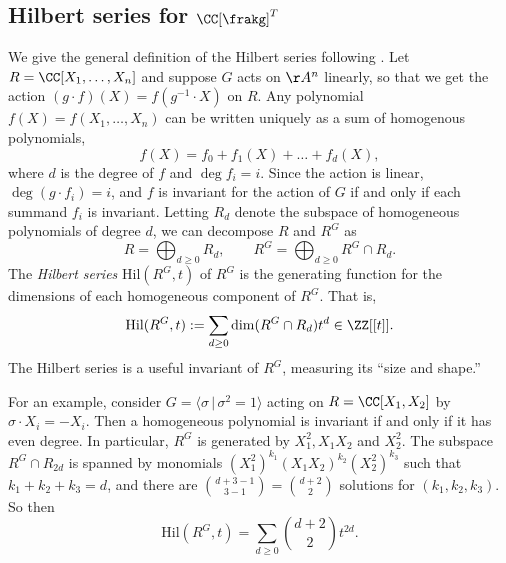 \subsection{Hilbert series for $\CC[\frakg]^T$}
We give the general definition of the Hilbert series following \cite[\S 1.2]{Mukai03}.
Let $R = \CC[X_1, \ldots, X_n]$ and suppose $G$ acts on $\AA^n$ linearly, so that we get the action $(g\cdot f)(X) = f(g^{-1} \cdot X)$ on $R$.
Any polynomial $f(X) = f(X_1, \ldots, X_n)$ can be written uniquely as a sum of homogenous polynomials,
$$f(X) = f_0 + f_1(X) + \ldots + f_d(X),$$
where $d$ is the degree of $f$ and $\deg f_i = i$.
Since the action is linear, $\deg (g\cdot f_i) = i$, and $f$ is invariant for the action of $G$ if and only if each summand $f_i$ is invariant.
Letting $R_d$ denote the subspace of homogeneous polynomials of degree $d$, we can decompose $R$ and $R^G$ as
$$R = \bigoplus_{d \ge 0} R_d, \qquad R^G = \bigoplus_{d \ge 0} R^G \cap R_d.$$
The \emph{Hilbert series} $\mathrm{Hil}(R^G, t)$ of $R^G$ is the generating function for the dimensions of each homogeneous component of $R^G$.
That is,
$$\mathrm{Hil}(R^G, t):= \sum_{d \ge 0} \dim (R^G \cap R_d) t^d \in \ZZ[[t]].$$
The Hilbert series is a useful invariant of $R^G$, measuring its ``size and shape.''

For an example, consider $G = \langle \sigma \, | \, \sigma^2 = 1\rangle$ acting on $R = \CC[X_1, X_2]$ by $\sigma \cdot X_i = - X_i.$
Then a homogeneous polynomial is invariant if and only if it has even degree.
In particular, $R^G$ is generated by $X_1^2, X_1 X_2$ and $X_2^2$.
The subspace $R^G \cap R_{2d}$ is spanned by monomials $(X_1^2)^{k_1} (X_1 X_2)^{k_2} (X_2^2)^{k_3}$ such that $k_1 + k_2 + k_3 = d$, and there are ${d + 3 - 1 \choose 3 - 1} = {d + 2 \choose 2}$ solutions for $(k_1, k_2, k_3)$.
So then
$$\mathrm{Hil}(R^G, t) = \sum_{d \ge 0} {d + 2 \choose 2} t^{2d}.$$